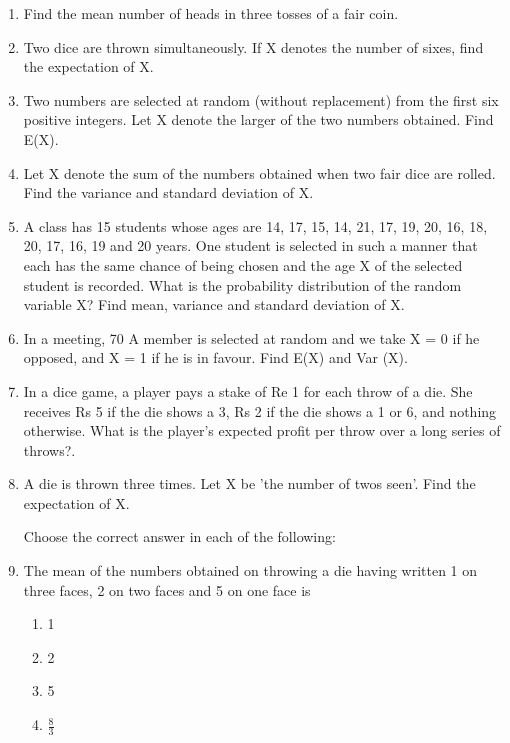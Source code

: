 \begin{enumerate}[label=\thechapter.\arabic*,ref=\thechapter.\theenumi]
\item 
Find the mean number of heads in three tosses of a fair coin.
\\
\solution


\item Two dice are thrown simultaneously. If X denotes the number of sixes, find the
expectation of X.

\item Two numbers are selected at random (without replacement) from the first six
positive integers. Let X denote the larger of the two numbers obtained. Find
E(X).

\item Let X denote the sum of the numbers obtained when two fair dice are rolled.
Find the variance and standard deviation of X.

\item A class has 15 students whose ages are 14, 17, 15, 14, 21, 17, 19, 20, 16, 18, 20,
17, 16, 19 and 20 years. One student is selected in such a manner that each has
the same chance of being chosen and the age X of the selected student is
recorded. What is the probability distribution of the random variable X? Find
mean, variance and standard deviation of X.

\item In a meeting, 70%
A member is selected at random and we take X = 0 if he opposed, and X = 1 if
he is in favour. Find E(X) and Var (X).\\

\item In a dice game, a player pays a stake of Re 1 for each throw of a die. She receives Rs 5 if the die shows a 3, Rs 2 if the die shows a 1 or 6, and nothing otherwise. What is the player’s expected profit per throw over a long series of throws?.\\
\solution


\item A die is thrown three times. Let X be 'the number of twos seen'. Find the expectation of X.\\
\solution


Choose the correct answer in each of the following:



\item The mean of the numbers obtained on throwing a die having written 1 on three
faces, 2 on two faces and 5 on one face is
\begin{enumerate}
\item 1
\item 2
\item 5
\item $\frac{8}{3}$


\end{enumerate}
\end{enumerate}
